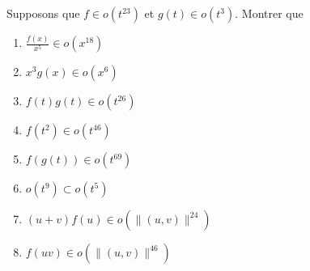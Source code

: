 
\begin{exercice}\label{exoDevel0008}


Supposons que $f \in o(t^{23})$ et $ g(t) \in o(t^3)$. Montrer que
\begin{multicols}{2}
\begin{enumerate}
	\item $ \frac{ f(x) }{x^5} \in o(x^{18}) $
	\item $ x^3 g(x) \in o(x^6) $
	\item $ f(t)g(t) \in o(t^{26}) $
	\item $ f(t^2) \in o(t^{46}) $
	\item $ f(g(t)) \in o(t^{69}) $
	\item $ o(t^9) \subset o(t^5) $
	\item $ (u+v)f(u) \in o(\| (u,v) \|^{24}) $
	\item $ f(uv) \in o( \| (u,v) \|^{46}) $
\end{enumerate}
\end{multicols}

\end{exercice}
